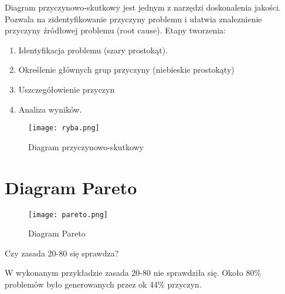Diagram przyczynowo-skutkowy jest jednym z narzędzi doskonalenia jakości. Pozwala na zidentyfikowanie przyczyny problemu i ułatwia znaleznienie przyczyny źródłowej problemu (root cause). Etapy tworzenia:
\begin{enumerate}
\item	Identyfikacja problemu (szary prostokąt).
\item	Określenie głównych grup przyczyny (niebieskie prostokąty)
\item	Uszczegółowienie przyczyn 
\item	Analiza wyników.
\end{enumerate}

\begin{figure}[h]
\begin{center}
\texttt{[image: ryba.png]}
\caption[Diagram przyczynowo-skutkowy]{Diagram przyczynowo-skutkowy}
\label{rysunekProces}
\end{center}
\end{figure}




\section{Diagram Pareto}

\begin{figure}[h]
\begin{center}
\texttt{[image: pareto.png]}
\caption[Diagram Pareto]{Diagram Pareto}
\label{rysunekProces}
\end{center}
\end{figure}


Czy zasada 20-80 się sprawdza?

W wykonanym przykładzie zasada 20-80 nie sprawdziła się.  Około 80\% problemów było generowanych przez ok 44\% przyczyn.



